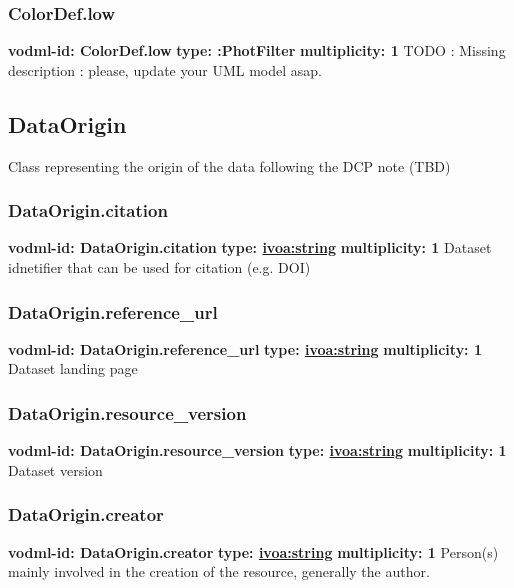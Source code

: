     \subsubsection{ColorDef.low}
      \textbf{vodml-id: ColorDef.low} \newline
      \textbf{type: :PhotFilter} \newline
      \textbf{multiplicity: 1} \newline
      TODO : Missing description : please, update your UML model asap.

  \subsection{DataOrigin}
  \label{sect:DataOrigin}
    Class representing the origin of the data following the DCP note (TBD)

    \subsubsection{DataOrigin.citation}
      \textbf{vodml-id: DataOrigin.citation} \newline
      \textbf{type: \hyperref[sect:ivoa]{ivoa:string}} \newline
      \textbf{multiplicity: 1} \newline
      Dataset idnetifier that can be used for citation (e.g. DOI)

    \subsubsection{DataOrigin.reference\_url}
      \textbf{vodml-id: DataOrigin.reference\_url} \newline
      \textbf{type: \hyperref[sect:ivoa]{ivoa:string}} \newline
      \textbf{multiplicity: 1} \newline
      Dataset landing page

    \subsubsection{DataOrigin.resource\_version}
      \textbf{vodml-id: DataOrigin.resource\_version} \newline
      \textbf{type: \hyperref[sect:ivoa]{ivoa:string}} \newline
      \textbf{multiplicity: 1} \newline
      Dataset version

    \subsubsection{DataOrigin.creator}
      \textbf{vodml-id: DataOrigin.creator} \newline
      \textbf{type: \hyperref[sect:ivoa]{ivoa:string}} \newline
      \textbf{multiplicity: 1} \newline
      Person(s) mainly involved in the creation of the resource, generally the author.

